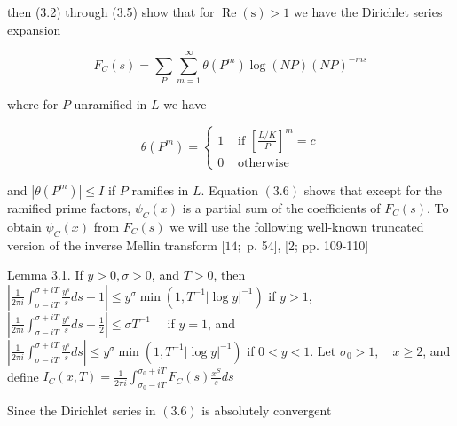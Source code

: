 then (3.2) through (3.5) show that for $\operatorname{Re}(\mathrm{s})>1$ we have the Dirichlet series expansion

$$
F_{C}(s)=\sum_{P} \sum_{m=1}^{\infty} \theta\left(P^{m}\right) \log (N P)(N P)^{-m s}
$$

where for $P$ unramified in $L$ we have

$$
\theta\left(P^{m}\right)= \begin{cases}1 & \text { if }\left[\frac{L / K}{P}\right]^{m}=c \\ 0 & \text { otherwise }\end{cases}
$$

and $\left|\theta\left(P^{m}\right)\right| \leqslant I$ if $P$ ramifies in $L$. Equation $(3.6)$ shows that except for the ramified prime factors, $\psi_{C}(x)$ is a partial sum of the coefficients of $F_{C}(s)$. To obtain $\psi_{C}(x)$ from $F_{C}(s)$ we will use the following well-known truncated version of the inverse Mellin transform $[14 ;$ p. 54], [2; pp. 109-110]

Lemma 3.1. If $y>0, \sigma>0$, and $T>0$, then $\left|\frac{1}{2 \pi i} \int_{\sigma-i T}^{\sigma+i T} \frac{y^{s}}{s} d s-1\right| \leqslant y^{\sigma} \min \left(1, T^{-1}|\log y|^{-1}\right)$ if $y>1$, $\left|\frac{1}{2 \pi i} \int_{\sigma-i T}^{\sigma+i T} \frac{y^{s}}{s} d s-\frac{1}{2}\right| \leqslant \sigma T^{-1} \quad$ if $y=1$, and $\left|\frac{1}{2 \pi i} \int_{\sigma-i T}^{\sigma+i T} \frac{y^{s}}{s} d s\right| \leqslant y^{\sigma} \min \left(1, T^{-1}|\log y|^{-1}\right)$ if $0<y<1$. Let $\sigma_{0}>1, \quad x \geqslant 2$, and define $I_{C}(x, T)=\frac{1}{2 \pi i} \int_{\sigma_{0}-i T}^{\sigma_{0}+i T} F_{C}(s) \frac{x^{S}}{s} d s$

Since the Dirichlet series in $(3.6)$ is absolutely convergent 

